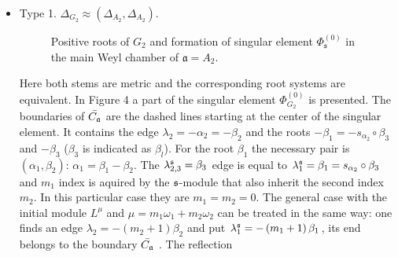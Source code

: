 \documentclass[12pt]{article}
\begin{document}
\begin{itemize}
\item
Type 1. $\Delta _{G_{2}}\approx (\Delta _{A_{2}},\Delta
_{A_{2}}).$

 \begin{figure}[h!bt]
  \noindent{}
  \caption{Positive roots of $G_{2}$ and formation of singular element $\Phi^{(0)}_{\mathfrak{s}}$ in the main Weyl chamber of $\mathfrak{a}=A_{2}$.}
\end{figure}
Here both stems are metric and the corresponding root systems are
equivalent. In Figure 4 a part of the singular element $\Phi
_{G_{2}}^{\left( 0\right) }$ is presented. The boundaries of $\bar{C_{\frak{a%
}}}$ are the dashed lines starting at the center of the singular
element. It
contains the edge $\lambda _{2}=-\alpha _{2}=-\beta _{2}$ and the roots $%
-\beta _{1}=-s_{\alpha _{2}}\circ \beta _{3}$ and $ -\beta _{3}$
($\beta _{3}$ is indicated as $\beta _{l}$). For the root $\beta
_{1}$ the necessary pair
is  $(\alpha _{1}, \beta _{2})$: $\alpha _{1}=\beta _{1}-\beta _{2}$. The $%
\lambda _{2,3}^{\frak{s}}=\beta _{3}$ edge is equal to $\lambda _{1}^{\frak{s%
}}=\beta _{1}=s_{\alpha _{2}}\circ \beta _{3}$ and $m_{1}$ index
is aquired by the $\frak{s}$-module that also inherit the second
index $m_{2}$. In this particular
case they are $m_{1}=m_{2}=0$. The general case with the initial module $%
L^{\mu }$ and $\mu =m_{1}\omega _{1}+m_{2}\omega _{2}$ can be
treated in the same way: one finds an edge $\lambda _{2}=-\left(
m_{2}+1\right) \beta _{2}$ and put $\lambda
_{1}^{\frak{s}}=-\left( m_{1}+1\right) \beta _{1}$, its end
belongs to the boundary $\bar{C_{\frak{a}}}$ . The reflection

\end{itemize}
\end{document}
